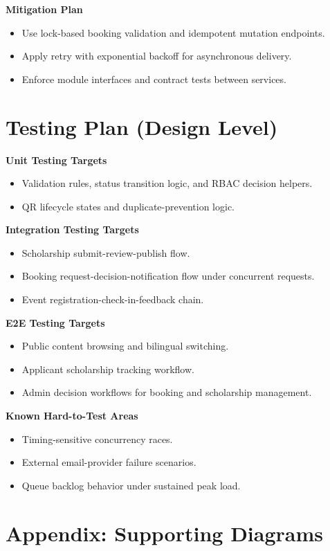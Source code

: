 \documentclass[12pt,a4paper]{article}
\begin{document}
\textbf{Mitigation Plan}
\begin{itemize}[nosep]
\item Use lock-based booking validation and idempotent mutation endpoints.
\item Apply retry with exponential backoff for asynchronous delivery.
\item Enforce module interfaces and contract tests between services.
\end{itemize}

\section{Testing Plan (Design Level)}

\textbf{Unit Testing Targets}
\begin{itemize}[nosep]
\item Validation rules, status transition logic, and RBAC decision helpers.
\item QR lifecycle states and duplicate-prevention logic.
\end{itemize}

\textbf{Integration Testing Targets}
\begin{itemize}[nosep]
\item Scholarship submit-review-publish flow.
\item Booking request-decision-notification flow under concurrent requests.
\item Event registration-check-in-feedback chain.
\end{itemize}

\textbf{E2E Testing Targets}
\begin{itemize}[nosep]
\item Public content browsing and bilingual switching.
\item Applicant scholarship tracking workflow.
\item Admin decision workflows for booking and scholarship management.
\end{itemize}

\textbf{Known Hard-to-Test Areas}
\begin{itemize}[nosep]
\item Timing-sensitive concurrency races.
\item External email-provider failure scenarios.
\item Queue backlog behavior under sustained peak load.
\end{itemize}

\section{Appendix: Supporting Diagrams}
\end{document}
